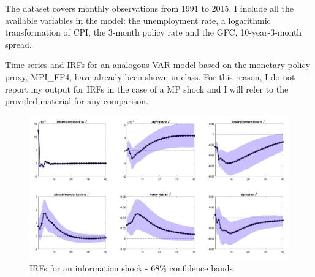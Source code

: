 \documentclass[11pt,a4paper]{article}
\begin{document}
The dataset covers monthly observations from 1991 to 2015. I include all the available variables in the model: the unemployment rate, a logarithmic transformation of CPI, the 3-month policy rate and the GFC, 10-year-3-month spread.

Time series and IRFs for an analogous VAR model based on the monetary policy proxy, MPI\_FF4, have already been shown in class. For this reason, I do not report my output for IRFs in the case of a MP shock and I will refer to the provided material for any comparison.


\newpage %

\begin{figure}
    \centering
    \includegraphics[scale=.5]{Graphs/IRF68.jpeg}
    \caption{IRFs for an information shock - 68\% confidence bands}
    \label{fig:IRF68}
  \end{figure}

  \newpage %
\end{document}
